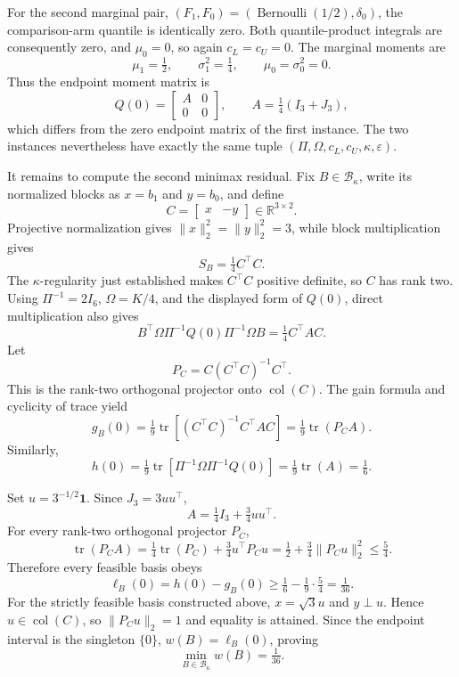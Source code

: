 For the second marginal pair, \((F_1,F_0)=(\operatorname{Bernoulli}(1/2),\delta_0)\), the comparison-arm quantile is identically zero.  Both quantile-product integrals are consequently zero, and \(\mu_0=0\), so again \(c_L=c_U=0\).  The marginal moments are
\[
\mu_1=\tfrac12,
\qquad \sigma_1^2=\tfrac14,
\qquad \mu_0=\sigma_0^2=0.
\]
Thus the endpoint moment matrix is
\[
Q(0)=\begin{bmatrix}A&0\\0&0\end{bmatrix},
\qquad
A=\tfrac14(I_3+J_3),
\]
which differs from the zero endpoint matrix of the first instance.  The two instances nevertheless have exactly the same tuple \((\Pi,\Omega,c_L,c_U,\kappa,\varepsilon)\).

It remains to compute the second minimax residual.  Fix \(B\in\mathcal B_\kappa\), write its normalized blocks as \(x=b_1\) and \(y=b_0\), and define
\[
C=\begin{bmatrix}x&-y\end{bmatrix}\in\mathbb R^{3\times2}.
\]
Projective normalization gives \(\lVert x\rVert_2^2=\lVert y\rVert_2^2=3\), while block multiplication gives
\[
S_B=\tfrac14C^{\top}C.
\]
The \(\kappa\)-regularity just established makes \(C^{\top}C\) positive definite, so \(C\) has rank two.  Using \(\Pi^{-1}=2I_6\), \(\Omega=K/4\), and the displayed form of \(Q(0)\), direct multiplication also gives
\[
B^{\top}\Omega\Pi^{-1}Q(0)\Pi^{-1}\Omega B
=\tfrac14C^{\top}AC.
\]
Let
\[
P_C=C(C^{\top}C)^{-1}C^{\top}.
\]
This is the rank-two orthogonal projector onto \(\operatorname{col}(C)\).  The gain formula and cyclicity of trace yield
\[
g_B(0)
=\tfrac19\operatorname{tr}\!\left[(C^{\top}C)^{-1}C^{\top}AC\right]
=\tfrac19\operatorname{tr}(P_CA).
\]
Similarly,
\[
h(0)
=\tfrac19\operatorname{tr}\!\left[\Pi^{-1}\Omega\Pi^{-1}Q(0)\right]
=\tfrac19\operatorname{tr}(A)
=\tfrac16.
\]

Set \(u=3^{-1/2}\mathbf1\).  Since \(J_3=3uu^{\top}\),
\[
A=\tfrac14I_3+\tfrac34uu^{\top}.
\]
For every rank-two orthogonal projector \(P_C\),
\[
\operatorname{tr}(P_CA)
=\tfrac14\operatorname{tr}(P_C)+\tfrac34u^{\top}P_Cu
=\tfrac12+\tfrac34\lVert P_Cu\rVert_2^2
\le\tfrac54.
\]
Therefore every feasible basis obeys
\[
\ell_B(0)=h(0)-g_B(0)
\ge\tfrac16-\tfrac19\cdot\tfrac54
=\tfrac1{36}.
\]
For the strictly feasible basis constructed above, \(x=\sqrt3u\) and \(y\perp u\).  Hence \(u\in\operatorname{col}(C)\), so \(\lVert P_Cu\rVert_2=1\) and equality is attained.  Since the endpoint interval is the singleton \(\{0\}\), \(w(B)=\ell_B(0)\), proving
\[
\min_{B\in\mathcal B_\kappa}w(B)=\tfrac1{36}.
\]

